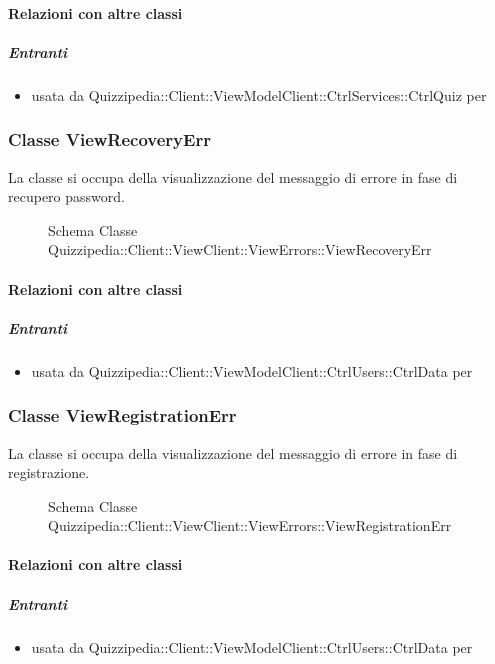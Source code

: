 \paragraph{Relazioni con altre classi}
\subparagraph{Entranti}
\begin{itemize}
\item usata da Quizzipedia::Client::ViewModelClient::CtrlServices::CtrlQuiz per 
\end{itemize}
\subsubsection{Classe ViewRecoveryErr}
La classe si occupa della visualizzazione del messaggio di errore in fase di recupero password.
\begin{figure}[H]
\centering
\noindent{}
\caption[Schema Classe ViewRecoveryErr]{Schema Classe Quizzipedia::Client::ViewClient::ViewErrors::ViewRecoveryErr}
\end{figure}
\paragraph{Relazioni con altre classi}
\subparagraph{Entranti}
\begin{itemize}
\item usata da Quizzipedia::Client::ViewModelClient::CtrlUsers::CtrlData per 
\end{itemize}
\subsubsection{Classe ViewRegistrationErr}
La classe si occupa della visualizzazione del messaggio di errore in fase di registrazione.
\begin{figure}[H]
\centering
\noindent{}
\caption[Schema Classe ViewRegistrationErr]{Schema Classe Quizzipedia::Client::ViewClient::ViewErrors::ViewRegistrationErr}
\end{figure}
\paragraph{Relazioni con altre classi}
\subparagraph{Entranti}
\begin{itemize}
\item usata da Quizzipedia::Client::ViewModelClient::CtrlUsers::CtrlData per 
\end{itemize}
